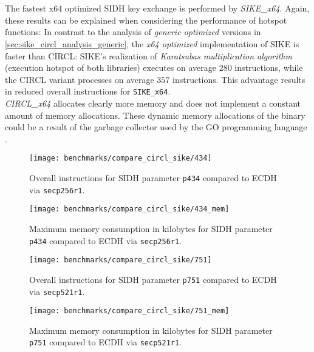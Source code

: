 \\\\
The fastest x64 optimized \gls{SIDH} key exchange is performed by \textit{SIKE\_x64}. Again, these results can be explained when considering the performance of hotspot functions: In contrast to the analysis of \textit{generic optimized} versions in \autoref{sec:sike_circl_analysis_generic}, the \textit{x64 optimized} implementation of \gls{SIKE} is faster than \gls{CIRCL}: \gls{SIKE}'s realization of \textit{Karatsubas multiplication algorithm} (execution hotspot of both libraries) executes on average $280$ instructions, while the \gls{CIRCL} variant processes on average $357$ instructions. This advantage results in reduced overall instructions for \texttt{SIKE\_x64}.\\
\textit{CIRCL\_x64} allocates clearly more memory and does not implement a constant amount of memory allocations. These dynamic memory allocations of the binary could be a result of the garbage collector used by the GO programming language \parencite{Hudson:GGC}.

\begin{figure}[H]
  \centering
  \texttt{[image: benchmarks/compare\_circl\_sike/434]}
  \caption[Overall instructions of SIKE and CIRCL using \texttt{p434}]
  {Overall instructions for \gls{SIDH} parameter \texttt{p434} compared to \gls{ECDH} via \texttt{secp256r1}.}
  \label{fig:results_opt_434}
\end{figure}

\begin{figure}[H]
  \centering
  \texttt{[image: benchmarks/compare\_circl\_sike/434\_mem]}
  \caption[Maximum memory consumption of SIKE and CIRCL using \texttt{p434}]
  {Maximum memory consumption in kilobytes for \gls{SIDH} parameter \texttt{p434} compared to \gls{ECDH} via \texttt{secp256r1}.}
  \label{fig:results_opt_434_mem}
\end{figure}

\begin{figure}[H]
  \centering
  \texttt{[image: benchmarks/compare\_circl\_sike/751]}
  \caption[Overall instructions of SIKE and CIRCL using \texttt{p751}]
  {Overall instructions for \gls{SIDH} parameter \texttt{p751} compared to \gls{ECDH} via \texttt{secp521r1}.}
  \label{fig:results_opt_751}
\end{figure}

\begin{figure}[H]
  \centering
  \texttt{[image: benchmarks/compare\_circl\_sike/751\_mem]}
  \caption[Maximum memory consumption  of SIKE and CIRCL using \texttt{p751}]
  {Maximum memory consumption in kilobytes for \gls{SIDH} parameter \texttt{p751} compared to \gls{ECDH} via \texttt{secp521r1}.}
  \label{fig:results_opt_751_mem}
\end{figure}

